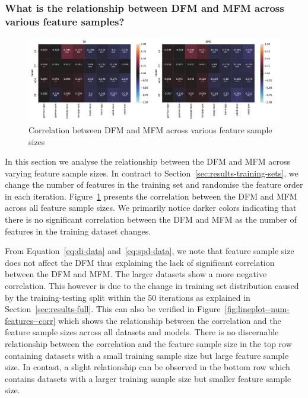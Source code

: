 \documentclass{article}
\begin{document}
\subsubsection{What is the relationship between DFM and MFM across various feature samples?}\label{sec:results-feature-sets}

\begin{figure}
  \centering
  \includegraphics[width=0.95\linewidth]{heatmap--corr--num-features.pdf}
  \caption{Correlation between DFM and MFM across various feature
    sample sizes}
  \label{fig:heatmap--corr--num-features}
\end{figure}

In this section we analyse the relationship between the DFM and MFM
across varying feature sample sizes. In contract to
Section \ref{sec:results-training-sets}, we change the number of
features in the training set and randomise the feature order in each
iteration. Figure \ref{fig:heatmap--corr--num-features} presents the
correlation between the DFM and MFM across all feature sample sizes.
We primarily notice darker colors indicating that there is no
significant correlation between the DFM and MFM as the number of
features in the training dataset changes.

From Equation \ref{eq:di-data} and \ref{eq:spd-data}, we note that
feature sample size does not affect the DFM thus explaining the lack
of significant correlation between the DFM and MFM. The larger
datasets show a more negative correlation. This however is due to the
change in training set distribution caused by the training-testing
split within the 50 iterations as explained
in Section \ref{sec:results-full}. This can also be verified in
Figure \ref{fig:lineplot--num-features--corr} which shows the
relationship between the correlation and the feature sample sizes
across all datasets and models. There is no discernable relationship
between the correlation and the feature sample size in the top row
containing datasets with a small training sample size but large
feature sample size. In contast, a slight relationship can be observed
in the bottom row which contains datasets with a larger training
sample size but smaller feature sample size.
\end{document}
